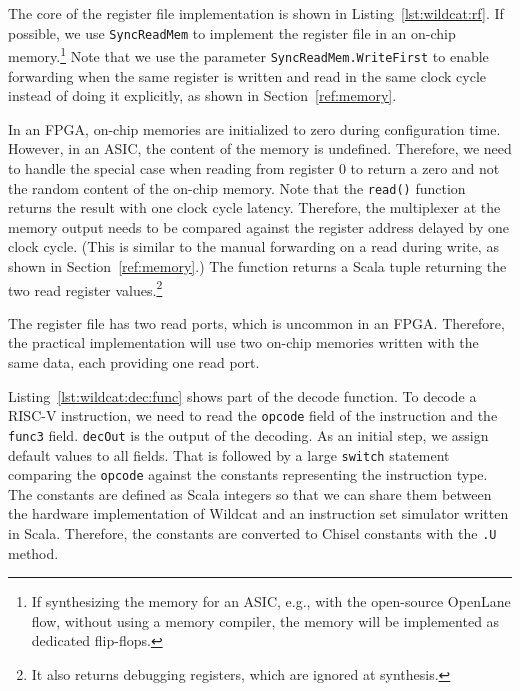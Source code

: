 \documentclass[%
    10pt,
    headinclude, footinclude=false,
    openright, %
    notitlepage,
    cleardoublepage=empty,
    headsepline,
    numbers=noenddot,
    bibliography=totoc, index=totoc,
    ]{scrbook}
\newcommand{\code}[1]{{\lstinline[basicstyle=\small\ttfamily]{#1}}}
\begin{document}

The core of the register file implementation is shown in Listing~\ref{lst:wildcat:rf}.
If possible, we use \code{SyncReadMem} to implement the register file in an on-chip memory.\footnote{If synthesizing the memory for an ASIC, e.g., with the open-source
OpenLane flow, without using a memory compiler, the memory will be implemented as
dedicated flip-flops.}
Note that we use the parameter \code{SyncReadMem.WriteFirst} to enable forwarding
when the same register is written and read in the same clock cycle instead of
doing it explicitly, as shown in Section~\ref{ref:memory}.

In an FPGA, on-chip memories are initialized to zero during configuration time.
However, in an ASIC, the content of the memory is undefined.
Therefore, we need to handle the special case when reading from register 0
to return a zero and not the random content of the on-chip memory.
Note that the \code{read()} function returns the result with one clock
cycle latency. Therefore, the multiplexer at the memory output
needs to be compared against the register address delayed by one clock cycle.
(This is similar to the manual forwarding on a read during write,
as shown in Section~\ref{ref:memory}.)
The function returns a Scala tuple returning the two read register
values.\footnote{It also returns debugging registers,
which are ignored at synthesis.}

The register file has two read ports, which is uncommon in an FPGA.
Therefore, the practical implementation will use two on-chip memories
written with the same data, each providing one read port.

 

Listing~\ref{lst:wildcat:dec:func} shows part of the decode function.
To decode a RISC-V instruction, we need to read the \code{opcode} field of
the instruction and the \code{func3} field. \code{decOut} is the output of
the decoding. As an initial step, we assign default values to all fields.
That is followed by a large \code{switch} statement comparing the \code{opcode}
against the constants representing the instruction type.
The constants are defined as Scala integers so that we can share them between the
hardware implementation of Wildcat and an instruction set simulator written in Scala.
Therefore, the constants are converted to Chisel constants with the \code{.U} method.
\end{document}
